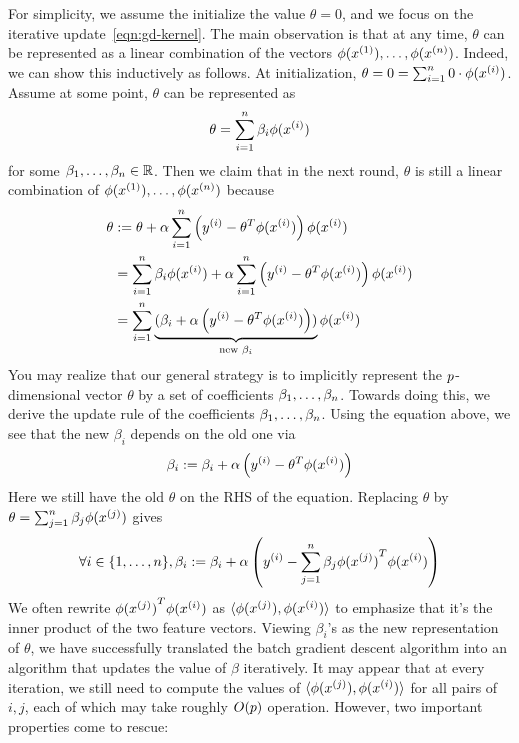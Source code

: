 \documentclass{article}
\begin{document}
For simplicity, we assume the initialize the value $\theta = 0$, and we focus on the iterative update~\eqref{eqn:gd-kernel}. The main observation is that at any time, $\theta$ can be represented as a linear combination of the vectors $\phi(x^{(1)}), \dots, \phi(x^{({n})})$. Indeed, we can show this inductively as follows. At initialization, $\theta = 0 = \sum_{i=1}^{{n}} 0\cdot \phi({x^{(i)}})$. Assume at some point, $\theta$ can be represented as 
\begin{align}
\theta = \sum_{i=1}^{{n}} \beta_i \phi(x^{(i)})
\end{align}
for some $\beta_1,\dots, \beta_{{n}}\in \mathbb{R}$. Then we claim that in the next round, $\theta$ is still a linear combination of $\phi(x^{(1)}), \dots, \phi(x^{({n})})$ because
\begin{align}
\theta & := \theta + \alpha \sum_{i=1}^{{n}} \left({y^{(i)}} - \theta^T \phi({x^{(i)}})\right) \phi(x^{(i)}) \nonumber\\
&  =  \sum_{i=1}^{{n}} \beta_i \phi(x^{(i)}) + \alpha \sum_{i=1}^{{n}} \left({y^{(i)}} - \theta^T \phi({x^{(i)}})\right) \phi(x^{(i)}) \nonumber\\
& =   \sum_{i=1}^{{n}} \underbrace{(\beta_i  + \alpha\left({y^{(i)}} - \theta^T \phi({x^{(i)}})\right))}_{\textup{new } \beta_i} \phi(x^{(i)}) \label{eqn:beta-inductive}
\end{align}
You may realize that our general strategy is to implicitly represent the $p$-dimensional vector $\theta$ by a set of coefficients $\beta_1,\dots, \beta_{{n}}$. Towards doing this, we derive the update rule of the coefficients $\beta_1,\dots, \beta_{{n}}$. Using the equation above, we see that the new $\beta_i$ depends on the old one via 
\begin{align}
\beta_i := \beta_i  + \alpha\left({y^{(i)}} - \theta^T \phi({x^{(i)}})\right)
\end{align}
Here we still have the old $\theta$ on the RHS of  the equation. Replacing $\theta$ by $\theta = \sum_{j=1}^{{n}} \beta_j \phi(x^{(j)})$ gives
\begin{align}
\forall i \in \{1,\dots, n\}, \beta_i := \beta_i  + \alpha\left({y^{(i)}} - \sum_{j=1}^{{n}} \beta_j {\phi(x^{(j)})}^T\phi({x^{(i)}})\right)\nonumber
\end{align}
We often rewrite ${\phi(x^{(j)})}^T\phi({x^{(i)}})$ as $\langle {\phi(x^{(j)})}, \phi({x^{(i)}})\rangle$ to emphasize that it's the inner product of the two feature vectors. Viewing $\beta_i$'s as the new representation of $\theta$,  we have successfully translated the batch gradient descent algorithm into an algorithm that updates the value of $\beta$ iteratively. It may appear that at every iteration, we still need to compute the values of $\langle {\phi(x^{(j)})}, \phi({x^{(i)}})\rangle$ for all pairs of $i,j$, each of which may take roughly $O(p)$ operation. However, two important properties come to rescue: 
\end{document}
